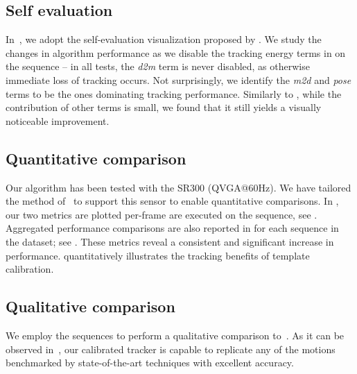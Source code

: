 

\subsection*{Self evaluation}
% 
In~, we adopt the self-evaluation visualization proposed by \cite{taylor2016concerto}. We study the changes in algorithm performance as we disable the tracking energy terms in  on the  sequence -- in all tests, the \emph{d2m} term is never disabled, as otherwise immediate loss of tracking occurs. Not surprisingly, we identify the \emph{m2d} and \emph{pose} terms to be the ones dominating tracking performance.
Similarly to \cite{taylor2016concerto}, while the contribution of other terms is small, we found that it still yields a visually noticeable improvement.

\subsection*{Quantitative comparison}
Our algorithm has been tested with the \realsense{} SR300 (QVGA@60Hz).  We have tailored the method of~\cite{tagliasacchi2015robust} to support this sensor to enable quantitative comparisons. In , our two metrics are plotted per-frame  are executed on the  sequence,  see \VideoHTrack{}. 
Aggregated performance comparisons are also reported in  for each sequence in the \handy{} dataset; see \VideoExtra{}. These metrics reveal a consistent and significant increase in performance.  quantitatively illustrates the tracking benefits of template calibration.

\subsection*{Qualitative comparison}
We employ the \handy{} sequences to perform a qualitative comparison to~\cite{qian2014realtime,sridhar2015fast,sharp2015accurate,taylor2016concerto}. As it can be observed in~\VideoExtra{}, our calibrated tracker is capable to replicate any of the motions benchmarked by state-of-the-art techniques with excellent accuracy.


